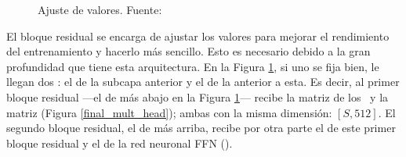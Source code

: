\begin{figure}[H]
    \centering
    \caption{Ajuste de valores. \scriptsize{Fuente: \parencite{transformers}}}
    \label{bloque_residual}
\end{figure}

El bloque residual \parencite{bloqueResidual} se encarga de ajustar los valores para mejorar el rendimiento del entrenamiento y hacerlo más sencillo. Esto es necesario debido a la gran profundidad que tiene esta arquitectura. En la Figura \ref{bloque_residual}, si uno se fija bien, le llegan dos : el de la subcapa anterior y el de la anterior a esta. Es decir, al primer bloque residual ---el de más abajo en la Figura \ref{bloque_residual}--- recibe la matriz de los \fnm\ y la matriz  (Figura \ref{final_mult_head}); ambas con la misma dimensión: $[S, 512]$. El segundo bloque residual, el de más arriba, recibe por otra parte el  de este primer bloque residual y el  de la red neuronal FFN ().

